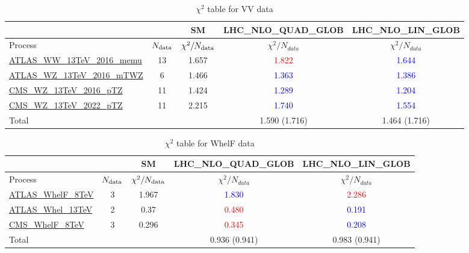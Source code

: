 \documentclass{article}
\begin{document}
\begin{table}[H]
\centering
\begin{tabular}{|l|c|c|c|c|}
\hline
 \multicolumn{2}{|c|}{} & SM& LHC_NLO_QUAD_GLOB& LHC_NLO_LIN_GLOB\\ \hline
Process & $N_{\rm data}$ & $\chi^ 2/N_{\rm data}$& $\chi^ 2/N_{data}$& $\chi^ 2/N_{data}$\\ \hline
\href{https://arxiv.org}{ATLAS_WW_13TeV_2016_memu} & 13 & 1.657 & \textcolor{red}                            {1.822} & \textcolor{blue}                            {1.644} \\ \hline
\href{https://arxiv.org}{ATLAS_WZ_13TeV_2016_mTWZ} & 6 & 1.466 & \textcolor{blue}                            {1.363} & \textcolor{blue}                            {1.386} \\ \hline
\href{https://arxiv.org}{CMS_WZ_13TeV_2016_pTZ} & 11 & 1.424 & \textcolor{blue}                            {1.289} & \textcolor{blue}                            {1.204} \\ \hline
\href{https://arxiv.org}{CMS_WZ_13TeV_2022_pTZ} & 11 & 2.215 & \textcolor{blue}                            {1.740} & \textcolor{blue}                            {1.554} \\ \hline
\hline Total & &  & 1.590 (1.716) & 1.464 (1.716) \\ \hline
\end{tabular}
\caption{$\chi^2$ table for VV data}
\end{table}
\begin{table}[H]
\centering
\begin{tabular}{|l|c|c|c|c|}
\hline
 \multicolumn{2}{|c|}{} & SM& LHC_NLO_QUAD_GLOB& LHC_NLO_LIN_GLOB\\ \hline
Process & $N_{\rm data}$ & $\chi^ 2/N_{\rm data}$& $\chi^ 2/N_{data}$& $\chi^ 2/N_{data}$\\ \hline
\href{https://arxiv.org}{ATLAS_WhelF_8TeV} & 3 & 1.967 & \textcolor{blue}                            {1.830} & \textcolor{red}                            {2.286} \\ \hline
\href{https://arxiv.org}{ATLAS_Whel_13TeV} & 2 & 0.37 & \textcolor{red}                            {0.480} & \textcolor{blue}                            {0.191} \\ \hline
\href{https://arxiv.org}{CMS_WhelF_8TeV} & 3 & 0.296 & \textcolor{red}                            {0.345} & \textcolor{blue}                            {0.208} \\ \hline
\hline Total & &  & 0.936 (0.941) & 0.983 (0.941) \\ \hline
\end{tabular}
\caption{$\chi^2$ table for WhelF data}
\end{table}
\end{document}
